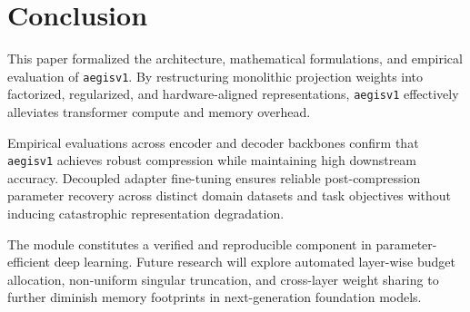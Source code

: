 \section{Conclusion}
This paper formalized the architecture, mathematical formulations, and empirical evaluation of \texttt{aegisv1}. By restructuring monolithic projection weights into factorized, regularized, and hardware-aligned representations, \texttt{aegisv1} effectively alleviates transformer compute and memory overhead.

Empirical evaluations across encoder and decoder backbones confirm that \texttt{aegisv1} achieves robust compression while maintaining high downstream accuracy. Decoupled adapter fine-tuning ensures reliable post-compression parameter recovery across distinct domain datasets and task objectives without inducing catastrophic representation degradation.

The module constitutes a verified and reproducible component in parameter-efficient deep learning. Future research will explore automated layer-wise budget allocation, non-uniform singular truncation, and cross-layer weight sharing to further diminish memory footprints in next-generation foundation models.
